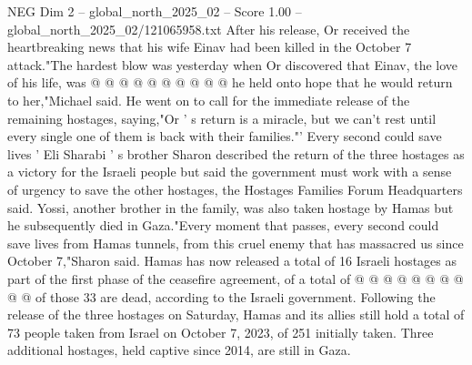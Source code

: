 \begin{textsample}{NEG Dim 2 – global\_north\_2025\_02 – Score 1.00 – global\_north\_2025\_02/121065958.txt}
After his release, Or received the heartbreaking news that his wife Einav had been killed in the October 7 attack."The hardest blow was yesterday when Or discovered that Einav, the love of his life, was @ @ @ @ @ @ @ @ @ @ he held onto hope that he would return to her,"Michael said.
He went on to call for the immediate release of the remaining hostages, saying,"Or ' s return is a miracle, but we can't rest until every single one of them is back with their families."' Every second could save lives ' Eli Sharabi ' s brother Sharon described the return of the three hostages as a victory for the Israeli people but said the government must work with a sense of urgency to save the other hostages, the Hostages Families Forum Headquarters said.
Yossi, another brother in the family, was also taken hostage by Hamas but he subsequently died in Gaza."Every moment that passes, every second could save lives from Hamas tunnels, from this cruel enemy that has massacred us since October 7,"Sharon said.
Hamas has now released a total of 16 Israeli hostages as part of the first phase of the ceasefire agreement, of a total of @ @ @ @ @ @ @ @ @ @ of those 33 are dead, according to the Israeli government.
Following the release of the three hostages on Saturday, Hamas and its allies still hold a total of 73 people taken from Israel on October 7, 2023, of 251 initially taken.
Three additional hostages, held captive since 2014, are still in Gaza.

\end{textsample}
